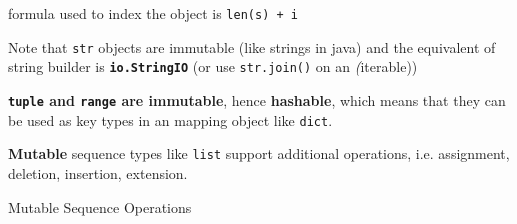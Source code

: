 \documentclass[10pt, openany]{article}
\begin{document}
  formula used to index the object is \texttt{len(s) + i}\par
  Note that \texttt{str} objects are immutable (like strings in java)
  and the equivalent of string builder is 
  \textbf{\texttt{io.StringIO}} (or use \texttt{str.join()} on an 
  \textit(iterable))\par
  \textbf{\texttt{tuple} and \texttt{range} are immutable}, hence
  \textbf{hashable}, which means that they can be used as key types
  in an mapping object like \texttt{dict}.\par
  \textbf{Mutable} sequence types like \texttt{list} support 
  additional operations, i.e. assignment, deletion, insertion, 
  extension.
  \begin{table}[t]
    \centering
    \caption{Mutable Sequence Operations}
  \end{table}
\end{document}

